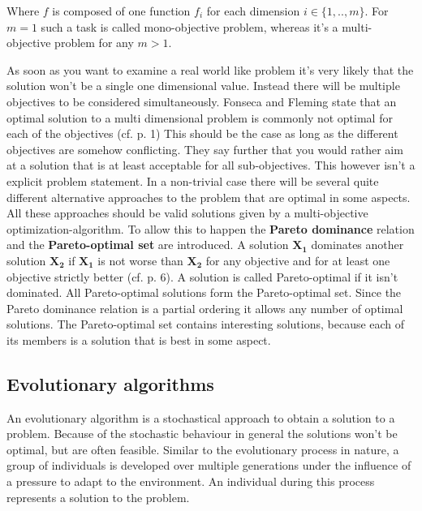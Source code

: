 \documentclass[12pt,twoside]{article}
\theoremstyle{plain}
\theoremstyle{definition}
\theoremstyle{remark}
\begin{document}
Where $f$ is composed of one function $f_i$ for each dimension $i \in \{1,..,m\}$.  
For $m = 1$ such a task is called mono-objective problem, whereas it's a multi-objective problem for any $m > 1$.

As soon as you want to examine a real world like problem it's very likely that the solution won't be a single one dimensional value. Instead there will be multiple objectives to be considered simultaneously.
Fonseca and Fleming state that an optimal solution to a multi dimensional problem is commonly not optimal for each of the objectives (cf. \cite{fonseca1995overview} p. 1)
This should be the case as long as the different objectives are somehow conflicting.
They say further that you would rather aim at a solution that is at least acceptable for all sub-objectives.
This however isn't a explicit problem statement. In a non-trivial case there will be several quite different alternative approaches to the problem that are optimal in some aspects.
All these approaches should be valid solutions given by a multi-objective optimization-algorithm.
To allow this to happen the \textbf{Pareto dominance} relation and the \textbf{Pareto-optimal set} are introduced.
A solution $\mathbf{X_1}$ dominates another solution $\mathbf{X_2}$ if $\mathbf{X_1}$ is not worse than $\mathbf{X_2}$ for any objective and for at least one objective strictly better (cf. \cite{doncieux2015multi} p. 6).
A solution is called Pareto-optimal if it isn't dominated. All Pareto-optimal solutions form the Pareto-optimal set. 
Since the Pareto dominance relation is a partial ordering it allows any number of optimal solutions.
The Pareto-optimal set contains interesting solutions, because each of its members is a solution that is best in some aspect.

\subsection{Evolutionary algorithms}
\label{back:evo}
An evolutionary algorithm is a stochastical approach to obtain a solution to a problem. Because of the stochastic behaviour in general the solutions won't be optimal, but are often feasible. Similar to the evolutionary process in nature, a group of individuals is developed over multiple generations under the influence of a pressure to adapt to the environment. An individual during this process represents a solution to the problem.\medskip
\end{document}
